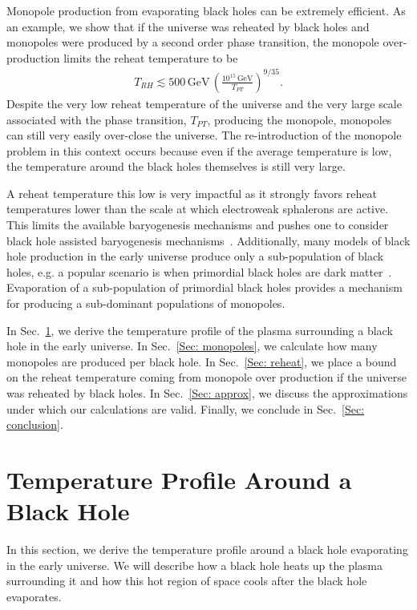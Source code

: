 \documentclass[superscriptaddress,groupedaddress,nofootnoteinbib,11pt]{article}
\newcommand\eea{\end{eqnarray}}
\newcommand\bea{\begin{eqnarray}}
\begin{document}
Monopole production from evaporating black holes can be extremely efficient.
As an example, we show that if the universe was reheated by black holes and monopoles were produced by a second order phase transition, the monopole over-production limits the reheat temperature to be
\bea
T_{RH} \lesssim 500 \, \text{GeV} \, \left ( \frac{10^{15} \, \text{GeV}}{T_{PT}} \right )^{9/35}.
\eea
Despite the very low reheat temperature of the universe and the very large scale associated with the phase transition, $T_{PT}$, producing the monopole, monopoles can still very easily over-close the universe.  
The re-introduction of the monopole problem in this context occurs because even if the average temperature is low, the temperature around the black holes themselves is still very large.

A reheat temperature this low is very impactful as it strongly favors reheat temperatures lower than the scale at which electroweak sphalerons are active.  This limits the available baryogenesis mechanisms and pushes one to consider black hole assisted baryogenesis mechanisms~\cite{Hawking:1974rv,Carr:1976zz,Turner:1979bt,PhysRevD.43.984,Majumdar:1995yr,Upadhyay:1999vk,Baumann:2007yr,Hook:2014mla,Fujita:2014hha,Hamada:2016jnq,Hooper:2020otu}.  Additionally, many models of black hole production in the early universe produce only a sub-population of black holes, e.g. a popular scenario is when primordial black holes are dark matter~\cite{Sasaki:2018dmp,Carr:2020gox,Green:2020jor}.  Evaporation of a sub-population of primordial black holes provides a mechanism for producing a sub-dominant populations of monopoles.


In Sec.~\ref{Sec: temp}, we derive the temperature profile of the plasma surrounding a black hole in the early universe.  
In Sec.~\ref{Sec: monopoles}, we calculate how many monopoles are produced per black hole.
In Sec.~\ref{Sec: reheat}, we place a bound on the reheat temperature coming from monopole over production if the universe was reheated by black holes.  
In Sec.~\ref{Sec: approx}, we discuss the approximations under which our calculations are valid.
Finally, we conclude in Sec.~\ref{Sec: conclusion}.

\section{Temperature Profile Around a Black Hole} \label{Sec: temp}

In this section, we derive the temperature profile around a black hole evaporating in the early universe.  We will describe how a black hole heats up the plasma surrounding it and how this hot region of space cools after the black hole evaporates.
\end{document}
